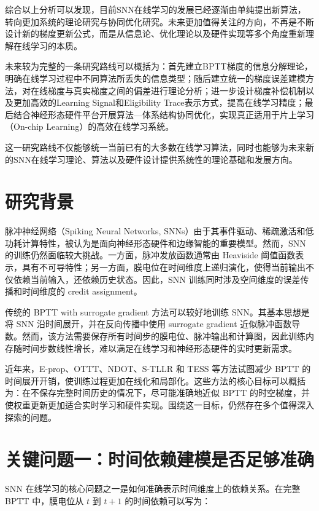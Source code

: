 \documentclass[11pt]{ctexart}
\begin{document}
综合以上分析可以发现，目前SNN在线学习的发展已经逐渐由单纯提出新算法，转向更加系统的理论研究与协同优化研究。未来更加值得关注的方向，不再是不断设计新的梯度更新公式，而是从信息论、优化理论以及硬件实现等多个角度重新理解在线学习的本质。

未来较为完整的一条研究路线可以概括为：首先建立BPTT梯度的信息分解理论，明确在线学习过程中不同算法所丢失的信息类型；随后建立统一的梯度误差建模方法，对在线梯度与真实梯度之间的偏差进行理论分析；进一步设计梯度补偿机制以及更加高效的Learning Signal和Eligibility Trace表示方式，提高在线学习精度；最后结合神经形态硬件平台开展算法—体系结构协同优化，实现真正适用于片上学习（On-chip Learning）的高效在线学习系统。

这一研究路线不仅能够统一当前已有的大多数在线学习算法，同时也能够为未来新的SNN在线学习理论、算法以及硬件设计提供系统性的理论基础和发展方向。


\section{研究背景}

脉冲神经网络（Spiking Neural Networks, SNNs）由于其事件驱动、稀疏激活和低功耗计算特性，被认为是面向神经形态硬件和边缘智能的重要模型。然而，SNN 的训练仍然面临较大挑战。一方面，脉冲发放函数通常由 Heaviside 阈值函数表示，具有不可导特性；另一方面，膜电位在时间维度上递归演化，使得当前输出不仅依赖当前输入，还依赖历史状态。因此，SNN 训练同时涉及空间维度的误差传播和时间维度的 credit assignment。

传统的 BPTT with surrogate gradient 方法可以较好地训练 SNN。其基本思想是将 SNN 沿时间展开，并在反向传播中使用 surrogate gradient 近似脉冲函数导数。然而，该方法需要保存所有时间步的膜电位、脉冲输出和计算图，因此训练内存随时间步数线性增长，难以满足在线学习和神经形态硬件的实时更新需求。

近年来，E-prop、OTTT、NDOT、S-TLLR 和 TESS 等方法试图减少 BPTT 的时间展开开销，使训练过程更加在线化和局部化。这些方法的核心目标可以概括为：在不保存完整时间历史的情况下，尽可能准确地近似 BPTT 的时空梯度，并使权重更新更加适合实时学习和硬件实现。围绕这一目标，仍然存在多个值得深入探索的问题。

\section{关键问题一：时间依赖建模是否足够准确}

SNN 在线学习的核心问题之一是如何准确表示时间维度上的依赖关系。在完整 BPTT 中，膜电位从 $t$ 到 $t+1$ 的时间依赖可以写为：
\end{document}
